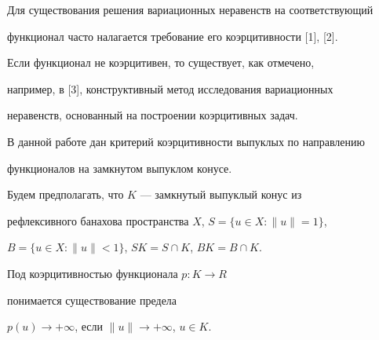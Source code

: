 \pagestyle{plain} %







\maketitle


\label{begin}








Для существования решения вариационных неравенств на соответствующий 


функционал часто налагается требование его коэрцитивности [1], [2].


Если функционал не коэрцитивен, то существует, как отмечено,


например, в [3], конструктивный метод исследования вариационных 


неравенств, основанный на построении коэрцитивных задач. 





В данной работе дан критерий коэрцитивности выпуклых по направлению 


функционалов на замкнутом выпуклом конусе.





Будем предполагать, что $K$ --- замкнутый выпуклый конус из 


рефлексивного банахова пространства $X$, $S=\{u \in X: \|u\|=1\}$, 


$B=\{u \in X: \|u\|<1\}$, $SK=S \cap K$, $BK = B \cap K$.


Под коэрцитивностью функционала $p: K \to R$


понимается существование предела


$p(u) \to +\infty$, если $\|u\| \to +\infty$, $u\in K$. 








